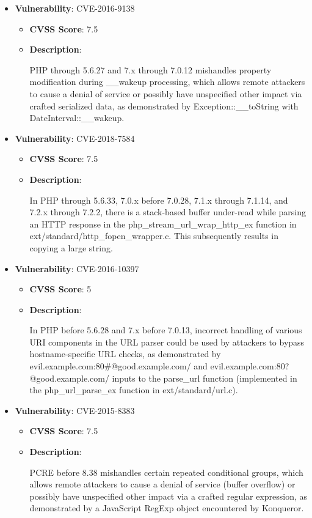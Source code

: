 \documentclass{article}
\begin{document}
\begin{itemize}
        \item \textbf{Vulnerability}: CVE-2016-9138
        \begin{itemize}
            \item \textbf{CVSS Score}:  7.5 
            \item \textbf{Description}:
            \parbox[t]{0.9\linewidth}{
                \ttfamily PHP through 5.6.27 and 7.x through 7.0.12 mishandles property modification during \_\_wakeup processing, which allows remote attackers to cause a denial of service or possibly have unspecified other impact via crafted serialized data, as demonstrated by Exception::\_\_toString with DateInterval::\_\_wakeup.
            }
        \end{itemize}
    
        \item \textbf{Vulnerability}: CVE-2018-7584
        \begin{itemize}
            \item \textbf{CVSS Score}:  7.5 
            \item \textbf{Description}:
            \parbox[t]{0.9\linewidth}{
                \ttfamily In PHP through 5.6.33, 7.0.x before 7.0.28, 7.1.x through 7.1.14, and 7.2.x through 7.2.2, there is a stack-based buffer under-read while parsing an HTTP response in the php\_stream\_url\_wrap\_http\_ex function in ext/standard/http\_fopen\_wrapper.c. This subsequently results in copying a large string.
            }
        \end{itemize}
    
        \item \textbf{Vulnerability}: CVE-2016-10397
        \begin{itemize}
            \item \textbf{CVSS Score}:  5 
            \item \textbf{Description}:
            \parbox[t]{0.9\linewidth}{
                \ttfamily In PHP before 5.6.28 and 7.x before 7.0.13, incorrect handling of various URI components in the URL parser could be used by attackers to bypass hostname-specific URL checks, as demonstrated by evil.example.com:80\#@good.example.com/ and evil.example.com:80?@good.example.com/ inputs to the parse\_url function (implemented in the php\_url\_parse\_ex function in ext/standard/url.c).
            }
        \end{itemize}
    
        \item \textbf{Vulnerability}: CVE-2015-8383
        \begin{itemize}
            \item \textbf{CVSS Score}:  7.5 
            \item \textbf{Description}:
            \parbox[t]{0.9\linewidth}{
                \ttfamily PCRE before 8.38 mishandles certain repeated conditional groups, which allows remote attackers to cause a denial of service (buffer overflow) or possibly have unspecified other impact via a crafted regular expression, as demonstrated by a JavaScript RegExp object encountered by Konqueror.
            }
        \end{itemize}
    

\end{itemize}
\end{document}
